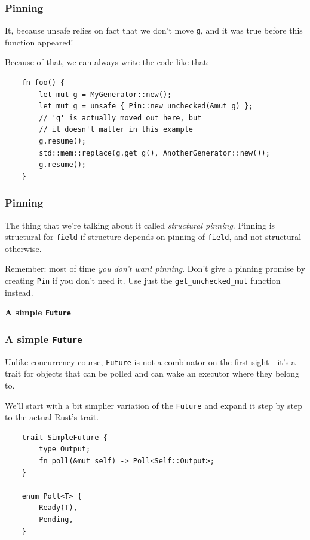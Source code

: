 \documentclass[aspectratio=1610,t]{beamer}
\begin{document}

\begin{frame}[fragile]
\frametitle{Pinning}
It, because unsafe relies on fact that we don't move \texttt{g}, and it was true before this function appeared!

Because of that, we can always write the code like that:

\begin{verbatim}
    fn foo() {
        let mut g = MyGenerator::new();
        let mut g = unsafe { Pin::new_unchecked(&mut g) };
        // 'g' is actually moved out here, but
        // it doesn't matter in this example
        g.resume();
        std::mem::replace(g.get_g(), AnotherGenerator::new());
        g.resume();
    }
\end{verbatim}
\end{frame}


\begin{frame}[fragile]
\frametitle{Pinning}
The thing that we're talking about it called \textit{structural pinning}. Pinning is structural for \texttt{field} if structure depends on pinning of \texttt{field}, and not structural otherwise.

Remember: most of time \textit{you don't want pinning}. Don't give a pinning promise by creating \texttt{Pin} if you don't need it. Use just the \texttt{get\_unchecked\_mut} function instead.
\end{frame}


\begin{frame}[c]
\centering\Huge\textbf{A simple \texttt{Future}}
\end{frame}


\begin{frame}[fragile]
\frametitle{A simple \texttt{Future}}
Unlike concurrency course, \texttt{Future} is not a combinator on the first sight - it's a trait for objects that can be polled and can wake an executor where they belong to.

We'll start with a bit simplier variation of the \texttt{Future} and expand it step by step to the actual Rust's trait.

\begin{verbatim}
    trait SimpleFuture {
        type Output;
        fn poll(&mut self) -> Poll<Self::Output>;
    }

    enum Poll<T> {
        Ready(T),
        Pending,
    }
\end{verbatim}
\end{frame}
\end{document}
